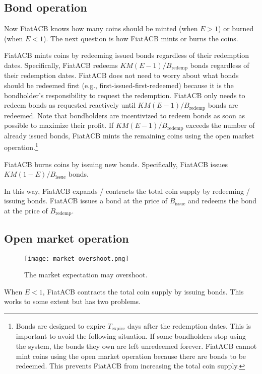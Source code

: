 \documentclass[dvipdfmx,a4paper]{article}
\begin{document}
\subsection{Bond operation}

Now FiatACB knows how many coins should be minted (when $E>1$) or burned (when $E<1$). The next question is how FiatACB mints or burns the coins.

FiatACB mints coins by redeeming issued bonds regardless of their redemption dates. Specifically, FiatACB redeems $KM(E-1)/B_{\mathrm{redemp}}$ bonds regardless of their redemption dates. FiatACB does not need to worry about what bonds should be redeemed first (e.g., first-issued-first-redeemed) because it is the bondholder's responsibility to request the redemption. FiatACB only needs to redeem bonds as requested reactively until $KM(E-1)/B_{\mathrm{redemp}}$ bonds are redeemed. Note that bondholders are incentivized to redeem bonds as soon as possible to maximize their profit. If $KM(E-1)/B_{\mathrm{redemp}}$ exceeds the number of already issued bonds, FiatACB mints the remaining coins using the open market operation.\footnote{Bonds are designed to expire $T_{\mathrm{expire}}$ days after the redemption dates. This is important to avoid the following situation. If some bondholders stop using the system, the bonds they own are left unredeemed forever. FiatACB cannot mint coins using the open market operation because there are bonds to be redeemed. This prevents FiatACB from increasing the total coin supply.}

FiatACB burns coins by issuing new bonds. Specifically, FiatACB issues $KM(1-E)/B_{\mathrm{issue}}$ bonds.

In this way, FiatACB expands / contracts the total coin supply by redeeming / issuing bonds. FiatACB issues a bond at the price of $B_{\mathrm{issue}}$ and redeems the bond at the price of $B_{\mathrm{redemp}}$.

\subsection{Open market operation}
\label{section_overshoot}

\begin{figure}[tb]
\centering
\texttt{[image: market\_overshoot.png]}
\caption{The market expectation may overshoot.}
\label{market_overshoot}
\end{figure}

When $E<1$, FiatACB contracts the total coin supply by issuing bonds. This works to some extent but has two problems.
\end{document}
